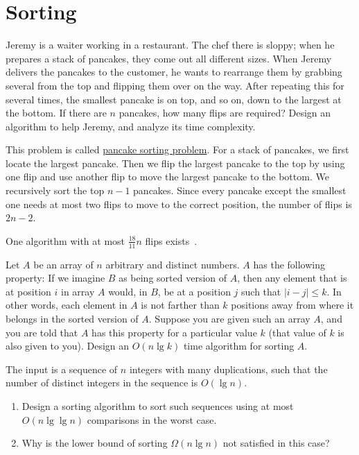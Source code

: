 \section{Sorting}

\begin{Exercise}
Jeremy is a waiter working in a restaurant. The chef there is sloppy; when he prepares a stack of pancakes, they come out all different sizes. When Jeremy delivers the pancakes to the customer, he wants to rearrange them by grabbing several from the top and flipping them over on the way. After repeating this for several times, the smallest pancake is on top, and so on, down to the largest at the bottom. If there are $n$ pancakes, how many flips are required? Design an algorithm to help Jeremy, and analyze its time complexity.  
\end{Exercise}
\begin{Answer}
This problem is called \href{https://en.wikipedia.org/wiki/Pancake_sorting}{pancake sorting problem}. For a stack of pancakes, we first locate the largest pancake. Then we flip the largest pancake to the top by using one flip and use another flip to move the largest pancake to the bottom. We recursively sort the top $n-1$ pancakes. Since every pancake except the smallest one needs at most two flips to move to the correct position, the number of flips is $2n - 2$.

One algorithm with at most $\frac{18}{11}n$ flips exists~\cite{Chitturi2009}.
\end{Answer}

\begin{Exercise}
Let $A$ be an array of $n$ arbitrary and distinct numbers. $A$ has the following property: If we imagine $B$ as being sorted version of $A$, then any element that is at position $i$ in array $A$ would, in $B$, be at a position $j$ such that $| i - j | \leq k$. In other words, each element in $A$ is not farther than $k$ positions away from where it belongs in the sorted version of $A$. Suppose you are given such an array $A$, and you are told that $A$ has this property for a particular value $k$ (that value of $k$ is also given to you). Design an $O(n \lg k)$ time algorithm for sorting $A$. 
\end{Exercise}
\begin{Answer}
\end{Answer}

\begin{Exercise}
The input is a sequence of $n$ integers with many duplications, such that the number of distinct integers in the sequence is $O(\lg n)$.
\begin{enumerate}
\item Design a sorting algorithm to sort such sequences using at most $O(n \lg \lg n)$ comparisons in the worst case.
\item Why is the lower bound of sorting $\Omega(n \lg n)$ not satisfied in this case? 
\end{enumerate}
\end{Exercise}
\begin{Answer}
\end{Answer}

